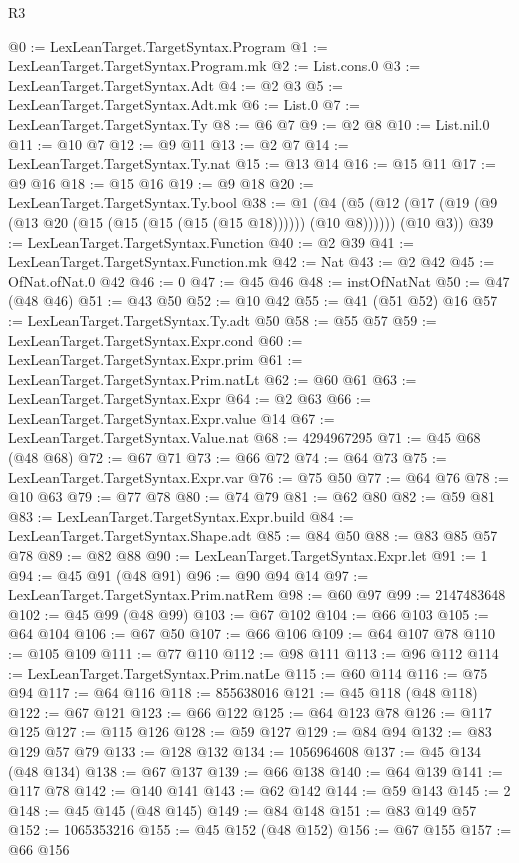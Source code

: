 \begin{lexlean}{R3}
\begin{coremodule}
@0 := LexLeanTarget.TargetSyntax.Program
@1 := LexLeanTarget.TargetSyntax.Program.mk
@2 := List.cons.{0}
@3 := LexLeanTarget.TargetSyntax.Adt
@4 := @2 @3
@5 := LexLeanTarget.TargetSyntax.Adt.mk
@6 := List.{0}
@7 := LexLeanTarget.TargetSyntax.Ty
@8 := @6 @7
@9 := @2 @8
@10 := List.nil.{0}
@11 := @10 @7
@12 := @9 @11
@13 := @2 @7
@14 := LexLeanTarget.TargetSyntax.Ty.nat
@15 := @13 @14
@16 := @15 @11
@17 := @9 @16
@18 := @15 @16
@19 := @9 @18
@20 := LexLeanTarget.TargetSyntax.Ty.bool
@38 := @1
    (@4 (@5 (@12 (@17 (@19 (@9 (@13 @20 (@15 (@15 (@15 (@15 (@15 @18)))))) (@10 @8)))))) (@10 @3))
@39 := LexLeanTarget.TargetSyntax.Function
@40 := @2 @39
@41 := LexLeanTarget.TargetSyntax.Function.mk
@42 := Nat
@43 := @2 @42
@45 := OfNat.ofNat.{0} @42
@46 := 0
@47 := @45 @46
@48 := instOfNatNat
@50 := @47 (@48 @46)
@51 := @43 @50
@52 := @10 @42
@55 := @41 (@51 @52) @16
@57 := LexLeanTarget.TargetSyntax.Ty.adt @50
@58 := @55 @57
@59 := LexLeanTarget.TargetSyntax.Expr.cond
@60 := LexLeanTarget.TargetSyntax.Expr.prim
@61 := LexLeanTarget.TargetSyntax.Prim.natLt
@62 := @60 @61
@63 := LexLeanTarget.TargetSyntax.Expr
@64 := @2 @63
@66 := LexLeanTarget.TargetSyntax.Expr.value @14
@67 := LexLeanTarget.TargetSyntax.Value.nat
@68 := 4294967295
@71 := @45 @68 (@48 @68)
@72 := @67 @71
@73 := @66 @72
@74 := @64 @73
@75 := LexLeanTarget.TargetSyntax.Expr.var
@76 := @75 @50
@77 := @64 @76
@78 := @10 @63
@79 := @77 @78
@80 := @74 @79
@81 := @62 @80
@82 := @59 @81
@83 := LexLeanTarget.TargetSyntax.Expr.build
@84 := LexLeanTarget.TargetSyntax.Shape.adt
@85 := @84 @50
@88 := @83 @85 @57 @78
@89 := @82 @88
@90 := LexLeanTarget.TargetSyntax.Expr.let
@91 := 1
@94 := @45 @91 (@48 @91)
@96 := @90 @94 @14
@97 := LexLeanTarget.TargetSyntax.Prim.natRem
@98 := @60 @97
@99 := 2147483648
@102 := @45 @99 (@48 @99)
@103 := @67 @102
@104 := @66 @103
@105 := @64 @104
@106 := @67 @50
@107 := @66 @106
@109 := @64 @107 @78
@110 := @105 @109
@111 := @77 @110
@112 := @98 @111
@113 := @96 @112
@114 := LexLeanTarget.TargetSyntax.Prim.natLe
@115 := @60 @114
@116 := @75 @94
@117 := @64 @116
@118 := 855638016
@121 := @45 @118 (@48 @118)
@122 := @67 @121
@123 := @66 @122
@125 := @64 @123 @78
@126 := @117 @125
@127 := @115 @126
@128 := @59 @127
@129 := @84 @94
@132 := @83 @129 @57 @79
@133 := @128 @132
@134 := 1056964608
@137 := @45 @134 (@48 @134)
@138 := @67 @137
@139 := @66 @138
@140 := @64 @139
@141 := @117 @78
@142 := @140 @141
@143 := @62 @142
@144 := @59 @143
@145 := 2
@148 := @45 @145 (@48 @145)
@149 := @84 @148
@151 := @83 @149 @57
@152 := 1065353216
@155 := @45 @152 (@48 @152)
@156 := @67 @155
@157 := @66 @156

\end{coremodule}
\end{lexlean}
